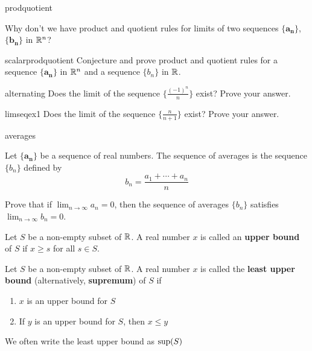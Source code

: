 \begin{problem}{prodquotient}

Why don't we have product and quotient rules for limits of two sequences $\{\bm{a_n}\}$, $\{\bm{b_n}\}$ in $\mathbb{R}^n$?

\end{problem}

\begin{problem}{scalarprodquotient}
Conjecture and prove product and quotient rules for a sequence $\{\bm{a_n}\}$ in $\mathbb{R}^n$ and a sequence $\{b_n\}$ in $\mathbb{R}$.
\end{problem}

\begin{problem}{alternating}
Does the limit of the sequence $\{\frac{(-1)^n}{n}\}$ exist?  Prove your answer.
\end{problem}

\begin{problem}{limseqex1}
Does the limit of the sequence $\{\frac{n}{n+1}\}$ exist?  Prove your answer.
\end{problem}



\begin{problem}{averages}

Let $\{\bm{a_n}\}$ be a sequence of real numbers.  The sequence of averages is the sequence $\{b_n\}$ defined by $$b_n = \frac{a_1 + \cdots + a_n}{n}$$

Prove that if $\lim_{n \to \infty} a_n = 0$, then the sequence of averages $\{b_n\}$ satisfies $\lim_{n \to \infty} b_n = 0$.

\end{problem}

\begin{definition}
Let $S$ be a non-empty subset of $\mathbb{R}$.  A real number $x$ is called an \textbf{upper bound} of $S$ if $x \geq s$ for all $s \in S$.
\end{definition}

\begin{definition}
Let $S$ be a non-empty subset of $\mathbb{R}$.  A real number $x$ is called the \textbf{least upper bound} (alternatively, \textbf{supremum}) of $S$ if
\begin{enumerate}
    \item $x$ is an upper bound for $S$
    \item If $y$ is an upper bound for $S$, then $x \leq y$
\end{enumerate}

We often write the least upper bound as $\textnormal{sup}(S)$
\end{definition}

